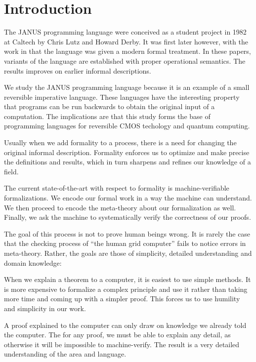 \chapter{Introduction}

The JANUS programming language were conceived as a student project in
1982 at Caltech by Chris Lutz and Howard Derby. It was first later
however, with the work in \cite{glueck+2007, glueck+2008} that
the language was given a modern formal treatment. In these papers, variants
of the language are established with proper operational semantics. The
results improves on earlier informal descriptions.

We study the JANUS programming language because it is an example of a
small reversible imperative language. These languages have the
interesting property that programs can be run backwards to obtain
the original input of a computation. The implications are that this
study forms the base of programming languages for reversible CMOS
techology and quantum computing.

Usually when we add formality to a process, there is a need for
changing the original informal description. Formality enforces us to
optimize and make precise the definitions and results, which in turn
sharpens and refines our knowledge of a field.

The current state-of-the-art with respect to formality is
machine-verifiable formalizations. We encode our formal work in a way
the machine can understand. We then proceed to encode the meta-theory
about our formalization as well. Finally, we ask the machine to
systematically verify the correctness of our proofs.

The goal of this process is not to prove human beings wrong. It is
rarely the case that the checking process of ``the human grid
computer'' fails to notice errors in meta-theory. Rather, the goals
are those of simplicity, detailed understanding and domain knowledge:

When we explain a theorem to a computer, it is easiest to use simple
methods. It is more expensive to formalize a complex principle and use
it rather than taking more time and coming up with a simpler
proof. This forces us to use humility and simplicity in our work.

A proof explained to the computer can only draw on knowledge we
already told the computer. The for any proof, we must be able to
explain any detail, as otherwise it will be impossible to
machine-verify. The result is a very detailed understanding of the
area and language.

